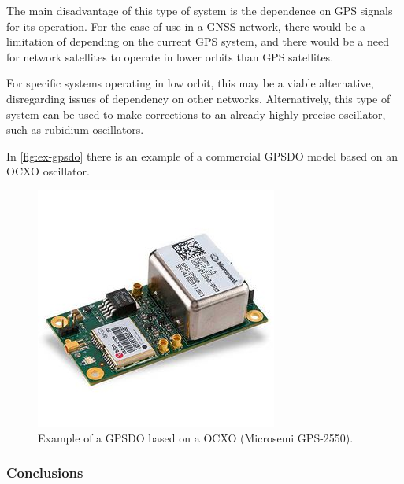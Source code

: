 The main disadvantage of this type of system is the dependence on GPS signals for its operation. For the case of use in a GNSS network, there would be a limitation of depending on the current GPS system, and there would be a need for network satellites to operate in lower orbits than GPS satellites.

For specific systems operating in low orbit, this may be a viable alternative, disregarding issues of dependency on other networks. Alternatively, this type of system can be used to make corrections to an already highly precise oscillator, such as rubidium oscillators.

In \autoref{fig:ex-gpsdo} there is an example of a commercial GPSDO model based on an OCXO oscillator.

\begin{figure}[!ht]
    \begin{center}
        \includegraphics[width=0.5\columnwidth]{figures/gps-2550}
        \caption{Example of a GPSDO based on a OCXO (Microsemi GPS-2550).}
        \label{fig:ex-gpsdo}
    \end{center}
\end{figure}

\subsubsection{Conclusions}

